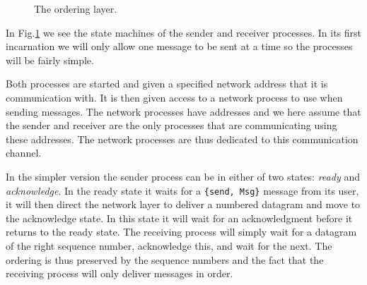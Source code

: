 \documentclass[a4paper,11pt]{article}
\begin{document}
\begin{figure}
\begin{adjustwidth}{-3cm}{-3cm}
\begin{subfigure}[b]{6cm}
{}
\end{subfigure}

\caption{The ordering layer.}
\label{fig:order}
\end{adjustwidth}
\end{figure}

In Fig.\ref{fig:order} we see the state machines of the sender and
receiver processes. In its first incarnation we will only allow one
message to be sent at a time so the processes will be fairly simple.

Both processes are started and given a specified network address that
it is communication with. It is then given access to a network process
to use when sending messages. The network processes have addresses and
we here assume that the sender and receiver are the only processes
that are communicating using these addresses. The network processes are
thus dedicated to this communication channel.

In the simpler version the sender process can be in either of two
states: {\em ready} and {\em acknowledge}. In the ready state it waits
for a {\tt \{send, Msg\}} message from its user, it will then direct
the network layer to deliver a numbered datagram and move to the
acknowledge state. In this state it will wait for an acknowledgment
before it returns to the ready state. The receiving process will
simply wait for a datagram of the right sequence number, acknowledge
this, and wait for the next. The ordering is thus preserved by the
sequence numbers and the fact that the receiving process will only
deliver messages in order.
\end{document}
